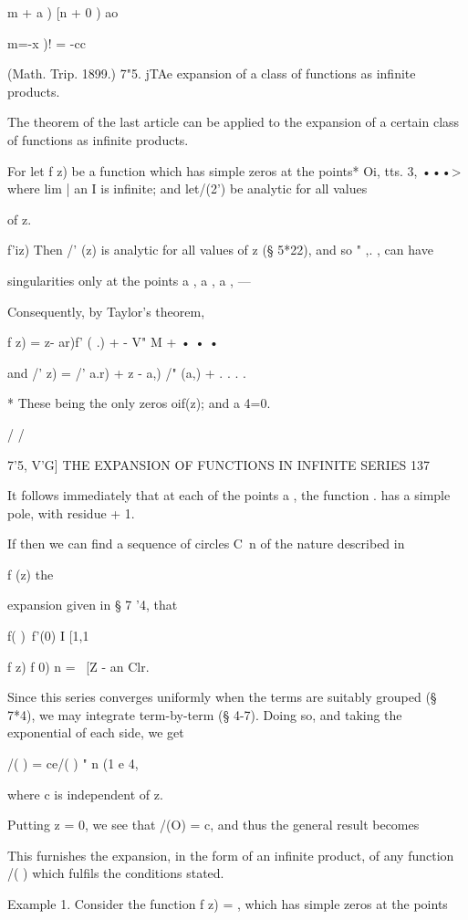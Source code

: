  m + a ) [n + 0 ) ao

m=-x )! = -cc

(Math. Trip. 1899.) 7"5. jTAe expansion of a class of functions as
infinite products.

The theorem of the last article can be applied to the expansion of a
certain class of functions as infinite products.

For let f z) be a function which has simple zeros at the points* Oi,
tts. 3, •••> where lim | an I is infinite; and let/(2') be analytic
for all values

of z.

f'iz) Then /' (z) is analytic for all values of z (§ 5*22), and so "
,. , can have

singularities only at the points a , a , a , —

Consequently, by Taylor's theorem,

f z) = z- ar)f' ( .) + - V" M + • • •

and /' z) = /' a.r) + z - a,) /" (a,) + . . . .

* These being the only zeros oif(z); and a 4=0.

/ /

7'5, V'G] THE EXPANSION OF FUNCTIONS IN INFINITE SERIES 137

It follows immediately that at each of the points a , the function .
has a simple pole, with residue + 1.

If then we can find a sequence of circles C\ n of the nature described
in

f (z) %
the

expansion given in § 7 '4, that

f( )\ f'(0) I [1,1

f z) f 0) n = \ [Z - an Clr.

Since this series converges uniformly when the terms are suitably
grouped (§ 7*4), we may integrate term-by-term (§ 4-7). Doing so, and
taking the exponential of each side, we get

/( ) = ce/( ) " n (1 e 4,

where c is independent of z.

Putting z = 0, we see that /(O) = c, and thus the general result
becomes

This furnishes the expansion, in the form of an infinite product, of
any function /( ) which fulfils the conditions stated.

Example 1. Consider the function f z) = , which has simple zeros at
the points

